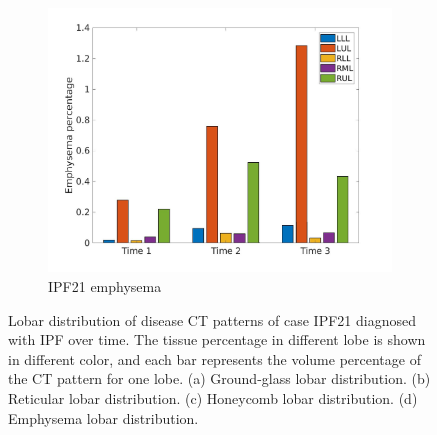 \begin{figure}[H]
\begin{subfigure}{.46\linewidth}
  \includegraphics[width=\linewidth,trim={{.0\wd0} {.0\wd0} {.0\wd0} {.0\wd0}},clip]{Appendix/Image_AppexA/LobarDistribution/IPF21EmphysemaLobarRegionDiseaseDistributionOverTime.jpg}
  \caption{IPF21 emphysema}
  \label{fig:IPF21LobarRegionDiseaseDistributionOverTime-d}
\end{subfigure}
\caption{Lobar distribution of disease CT patterns of case IPF21 diagnosed with IPF over time. The tissue percentage in different lobe is shown in different color, and each bar represents the volume percentage of the CT pattern for one lobe. (a) Ground-glass lobar distribution. (b) Reticular lobar distribution. (c) Honeycomb lobar distribution. (d) Emphysema lobar distribution.}
\label{fig:IPF21LobarRegionDiseaseDistributionOverTime}
\end{figure}

